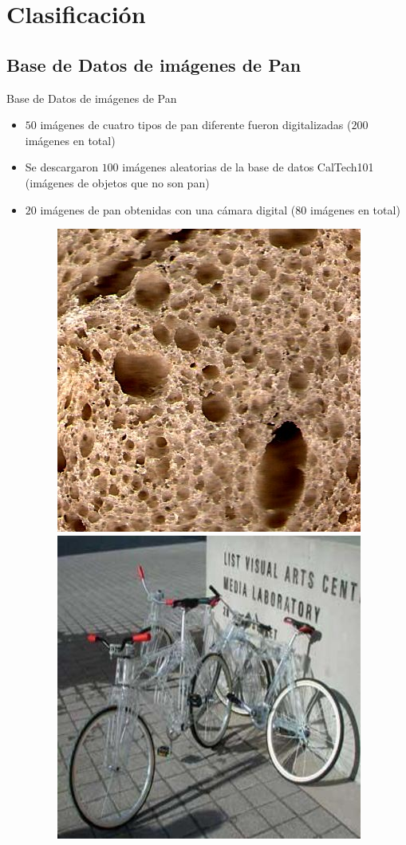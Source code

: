 \documentclass{beamer}
\begin{document}
\section{Clasificaci\'on}

\subsection{Base de Datos de im\'agenes de Pan}
\begin{frame}
{\huge Base de Datos de im\'agenes de Pan}
\begin{itemize}
\item $50$ im\'agenes de cuatro tipos de pan diferente fueron digitalizadas ($200$ im\'agenes en total)
\item Se descargaron $100$ im\'agenes aleatorias de la base de datos CalTech101 (im\'agenes de objetos que no son pan)
\item $20$ im\'agenes de pan obtenidas con una c\'amara digital ($80$ im\'agenes en total)
\begin{figure}
\centering
\includegraphics[scale=0.97]{../imagenes/baguette20}
\includegraphics[scale=0.2]{../exps/100sample/res/image_0351}

\end{figure}
\end{itemize}
\end{frame}
\end{document}
